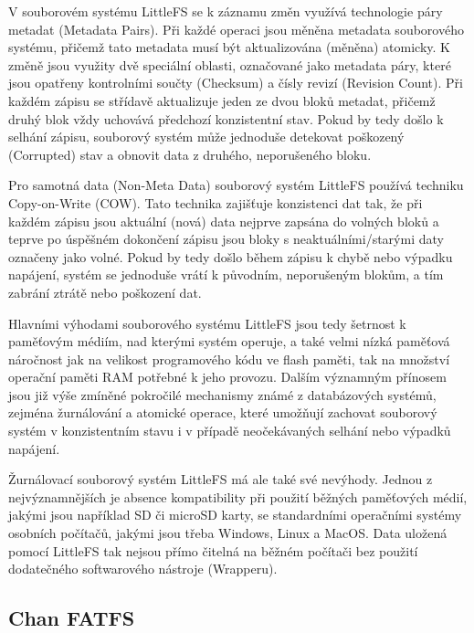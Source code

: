 V souborovém systému LittleFS se k záznamu změn využívá technologie páry metadat (Metadata Pairs). Při každé operaci jsou měněna metadata souborového systému, přičemž tato metadata musí být aktualizována (měněna) atomicky. K změně jsou využity dvě speciální oblasti, označované jako metadata páry, které jsou opatřeny kontrolními součty (Checksum) a čísly revizí (Revision Count). Při každém zápisu se střídavě aktualizuje jeden ze dvou bloků metadat, přičemž druhý blok vždy uchovává předchozí konzistentní stav. Pokud by tedy došlo k selhání zápisu, souborový systém může jednoduše detekovat poškozený (Corrupted) stav a obnovit data z druhého, neporušeného bloku. \cite{nxp_the_design_of_the_little_filesystem}

Pro samotná data (Non-Meta Data) souborový systém LittleFS používá techniku Copy-on-Write (COW). Tato technika zajišťuje konzistenci dat tak, že při každém zápisu jsou aktuální (nová) data nejprve zapsána do volných bloků a teprve po úspěšném dokončení zápisu jsou bloky s neaktuálními/starými daty označeny jako volné. Pokud by tedy došlo během zápisu k chybě nebo výpadku napájení, systém se jednoduše vrátí k původním, neporušeným blokům, a tím zabrání ztrátě nebo poškození dat. \cite{nxp_the_design_of_the_little_filesystem}

Hlavními výhodami souborového systému LittleFS jsou tedy šetrnost k paměťovým médiím, nad kterými systém operuje, a také velmi nízká paměťová náročnost jak na velikost programového kódu ve flash paměti, tak na množství operační paměti RAM potřebné k jeho provozu. Dalším významným přínosem jsou již výše zmíněné pokročilé mechanismy známé z databázových systémů, zejména žurnálování a atomické operace, které umožňují zachovat souborový systém v konzistentním stavu i v případě neočekávaných selhání nebo výpadků napájení. \cite{nxp_the_design_of_the_little_filesystem}

Žurnálovací souborový systém LittleFS má ale také své nevýhody. Jednou z nejvýznamnějších je absence kompatibility při použití běžných paměťových médií, jakými jsou například SD či microSD karty, se standardními operačními systémy osobních počítačů, jakými jsou třeba Windows, Linux a MacOS. Data uložená pomocí LittleFS tak nejsou přímo čitelná na běžném počítači bez použití dodatečného softwarového nástroje (Wrapperu). \cite{cnx_software_little_fs}

\subsection{Chan FATFS}



